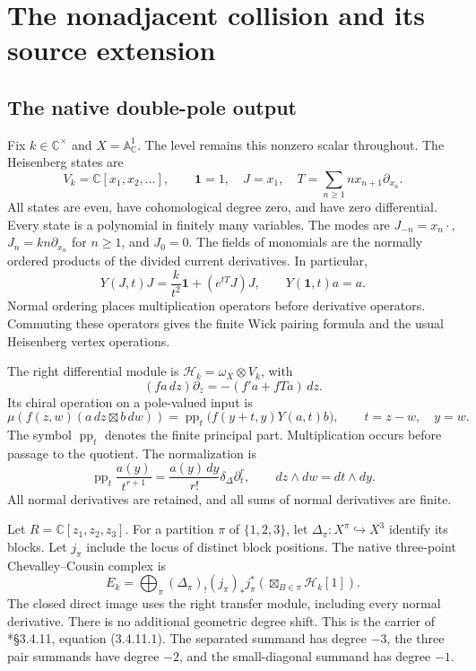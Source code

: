 \chapter{The nonadjacent collision and its source extension}
\label{chap:bdnz-source}

\section{The native double-pole output}

Fix $k\in\mathbb C^\times$ and $X=\mathbb A^1_{\mathbb C}$.
The level remains this nonzero scalar throughout.
The Heisenberg states are
\[
 V_k=\mathbb C[x_1,x_2,\ldots],\qquad
 \mathbf1=1,\quad J=x_1,\quad
 T=\sum_{n\geq1}n x_{n+1}\partial_{x_n}.
\]
All states are even, have cohomological degree zero, and have zero differential.
Every state is a polynomial in finitely many variables.
The modes are $J_{-n}=x_n\cdot$, $J_n=kn\partial_{x_n}$ for $n\geq1$, and $J_0=0$.
The fields of monomials are the normally ordered products of the divided current derivatives.
In particular,
\begin{equation}\label{eq:bdnz-field}
 Y(J,t)J=\frac{k}{t^2}\mathbf1+(e^{tT}J)J,
 \qquad Y(\mathbf1,t)a=a.
\end{equation}
Normal ordering places multiplication operators before derivative operators.
Commuting these operators gives the finite Wick pairing formula and the usual Heisenberg vertex operations.

The right differential module is $\mathcal H_k=\omega_X\otimes V_k$, with
\[
 (fa\,dz)\partial_z=-(f'a+fTa)\,dz.
\]
Its chiral operation on a pole-valued input is
\[
 \mu(f(z,w)(a\,dz\boxtimes b\,dw))
   =\operatorname{pp}_{t}\bigl(f(y+t,y)Y(a,t)b\bigr),
 \qquad t=z-w,\quad y=w.
\]
The symbol $\operatorname{pp}_t$ denotes the finite principal part.
Multiplication occurs before passage to the quotient.
The normalization is
\begin{equation}\label{eq:bdnz-normal}
 \operatorname{pp}_t\frac{a(y)}{t^{r+1}}
 =\frac{a(y)\,dy}{r!}\delta_\Delta\partial_t^r,
 \qquad dz\wedge dw=dt\wedge dy.
\end{equation}
All normal derivatives are retained, and all sums of normal derivatives are finite.

Let $R=\mathbb C[z_1,z_2,z_3]$.
For a partition $\pi$ of $\{1,2,3\}$, let $\Delta_\pi:X^\pi\hookrightarrow X^3$ identify its blocks.
Let $j_\pi$ include the locus of distinct block positions.
The native three-point Chevalley--Cousin complex is
\begin{equation}\label{eq:bdnz-native}
 E_k=
 \bigoplus_{\pi}
 (\Delta_\pi)_!(j_\pi)_*j_\pi^*
 \left(\boxtimes_{B\in\pi}\mathcal H_k[1]\right).
\end{equation}
The closed direct image uses the right transfer module, including every normal derivative.
There is no additional geometric degree shift.
This is the carrier of \cite{BDnonadjacent}*{\S3.4.11, equation (3.4.11.1)}.
The separated summand has degree $-3$, the three pair summands have degree $-2$, and the small-diagonal summand has degree $-1$.

